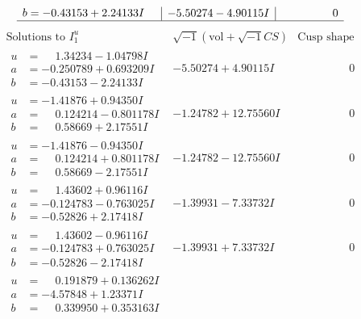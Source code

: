 \documentclass[1p]{elsarticle_modified}
\theoremstyle{definition}
\newcommand{\I}{\sqrt{-1}}
\begin{document}
$$\begin{array}{c|c|c}
\begin{aligned}
b &= -0.43153 + 2.24133 I\end{aligned}
 & -5.50274 - 4.90115 I & \phantom{-0.000000 } 0\\
 \hline 
 \end{array}$$\newpage$$\begin{array}{c|c|c}  
\text{Solutions to }I^u_{1}& \I (\text{vol} + \sqrt{-1}CS) & \text{Cusp shape}\\
 \hline 
\begin{aligned}
u &= \phantom{-}1.34234 - 1.04798 I \\
a &= -0.250789 + 0.693209 I \\
b &= -0.43153 - 2.24133 I\end{aligned}
 & -5.50274 + 4.90115 I & \phantom{-0.000000 } 0 \\ \hline\begin{aligned}
u &= -1.41876 + 0.94350 I \\
a &= \phantom{-}0.124214 - 0.801178 I \\
b &= \phantom{-}0.58669 + 2.17551 I\end{aligned}
 & -1.24782 + 12.75560 I & \phantom{-0.000000 } 0 \\ \hline\begin{aligned}
u &= -1.41876 - 0.94350 I \\
a &= \phantom{-}0.124214 + 0.801178 I \\
b &= \phantom{-}0.58669 - 2.17551 I\end{aligned}
 & -1.24782 - 12.75560 I & \phantom{-0.000000 } 0 \\ \hline\begin{aligned}
u &= \phantom{-}1.43602 + 0.96116 I \\
a &= -0.124783 - 0.763025 I \\
b &= -0.52826 + 2.17418 I\end{aligned}
 & -1.39931 - 7.33732 I & \phantom{-0.000000 } 0 \\ \hline\begin{aligned}
u &= \phantom{-}1.43602 - 0.96116 I \\
a &= -0.124783 + 0.763025 I \\
b &= -0.52826 - 2.17418 I\end{aligned}
 & -1.39931 + 7.33732 I & \phantom{-0.000000 } 0 \\ \hline\begin{aligned}
u &= \phantom{-}0.191879 + 0.136262 I \\
a &= -4.57848 + 1.23371 I \\
b &= \phantom{-}0.339950 + 0.353163 I\end{aligned}

\end{array}$$
\end{document}
